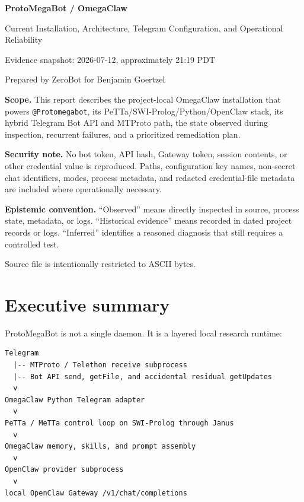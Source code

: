 \documentclass[10pt]{article}
\newcommand{\code}[1]{\texttt{#1}}
\begin{document}
\begin{titlepage}
\centering
\vspace*{1.0in}
{\Huge\bfseries\color{navy} ProtoMegaBot / OmegaClaw\par}
\vspace{0.18in}
{\LARGE Current Installation, Architecture, Telegram Configuration, and Operational Reliability\par}
\vspace{0.55in}
{\large Evidence snapshot: 2026-07-12, approximately 21:19 PDT\par}
\vspace{0.15in}
{\large Prepared by ZeroBot for Benjamin Goertzel\par}
\vfill
\begin{minipage}{0.88\textwidth}
\textbf{Scope.} This report describes the project-local OmegaClaw installation that powers \code{@Protomegabot}, its PeTTa/SWI-Prolog/Python/OpenClaw stack, its hybrid Telegram Bot API and MTProto path, the state observed during inspection, recurrent failures, and a prioritized remediation plan.

\textbf{Security note.} No bot token, API hash, Gateway token, session contents, or other credential value is reproduced. Paths, configuration key names, non-secret chat identifiers, modes, process metadata, and redacted credential-file metadata are included where operationally necessary.

\textbf{Epistemic convention.} ``Observed'' means directly inspected in source, process state, metadata, or logs. ``Historical evidence'' means recorded in dated project records or logs. ``Inferred'' identifies a reasoned diagnosis that still requires a controlled test.
\end{minipage}
\vfill
{\small Source file is intentionally restricted to ASCII bytes.}
\end{titlepage}

\tableofcontents
\newpage

\section{Executive summary}

ProtoMegaBot is not a single daemon. It is a layered local research runtime:

\begin{center}
\begin{minipage}{0.93\textwidth}
\begin{lstlisting}
Telegram
  |-- MTProto / Telethon receive subprocess
  |-- Bot API send, getFile, and accidental residual getUpdates
  v
OmegaClaw Python Telegram adapter
  v
PeTTa / MeTTa control loop on SWI-Prolog through Janus
  v
OmegaClaw memory, skills, and prompt assembly
  v
OpenClaw provider subprocess
  v
local OpenClaw Gateway /v1/chat/completions
\end{lstlisting}
\end{minipage}
\end{center}
\end{document}
